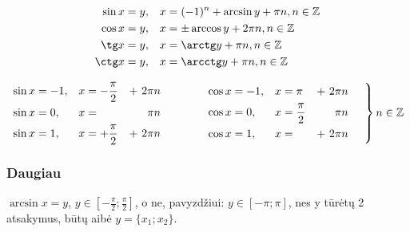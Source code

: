 \begin{equation}
    \begin{aligned}[c]
        \sin x &= y, & x &= (-1)^n + \arcsin y + \pi{n}, n \in \mathbb{Z} \\
        \cos x &= y, & x &= \pm \arccos y + 2\pi{n}, n \in \mathbb{Z} \\
        \tg  x &= y, & x &= \arctg y + \pi{n}, n \in \mathbb{Z} \\
        \ctg x &= y, & x &= \arcctg y + \pi{n}, n \in \mathbb{Z} \\
    \end{aligned}
\end{equation}

\begin{equation}
    \left.
    \begin{aligned}[c]
        \sin x &= -1, & x &= -\frac{\pi}{2} &+\ 2\pi{n} \\
        \sin x &=  0, & x &=                &    \pi{n} \\
        \sin x &=  1, & x &= +\frac{\pi}{2} &+\ 2\pi{n}
    \end{aligned}
    \hspace {15mm}
    \begin{aligned}[c]
        \cos x &= -1, & x &= \pi            &+\ 2\pi{n} \\
        \cos x &=  0, & x &= \frac{\pi}{2}  &    \pi{n} \\
        \cos x &=  1, & x &=                &+\ 2\pi{n}
    \end{aligned}
    \hspace{5mm}
    \right\}
    n \in \mathbb{Z}
\end{equation}

\subsubsection{Daugiau}

$\arcsin x = y$, $y \in [-\frac{\pi}{2}; \frac{\pi}{2}]$, o ne, pavyzdžiui: $y \in [-\pi; \pi]$, nes y tūrėtų 2 atsakymus, būtų aibė $y = \{x_1; x_2\}$.


